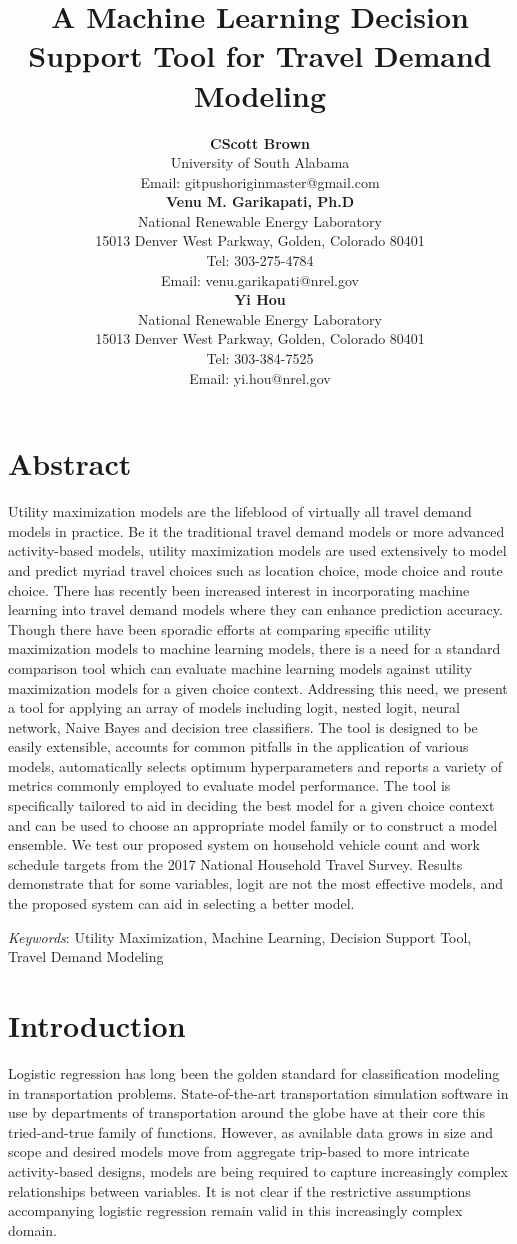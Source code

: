 \documentclass[numbered]{trbunofficial}
\title{A Machine Learning Decision Support Tool for Travel Demand Modeling}
\author{%
  \textbf{CScott Brown}\\
University of South Alabama\\
Email: gitpushoriginmaster@gmail.com\\
  \hfill\break%
  \textbf{Venu M. Garikapati, Ph.D}\\
National Renewable Energy Laboratory\\
15013 Denver West Parkway, Golden, Colorado 80401\\
Tel: 303-275-4784\\
Email: venu.garikapati@nrel.gov\\
  \hfill\break%
  \textbf{Yi Hou}\\
National Renewable Energy Laboratory\\
15013 Denver West Parkway, Golden, Colorado 80401\\
Tel: 303-384-7525\\
Email: yi.hou@nrel.gov \\
}
\begin{document}
\maketitle



\section{Abstract}
Utility maximization models are the lifeblood of virtually all travel demand models in practice. 
 Be it the traditional travel demand models or more advanced activity-based models, utility maximization models are used extensively to model and predict myriad travel choices such as location choice, mode choice and route choice. 
 There has recently been increased interest in incorporating machine learning into travel demand models where they can enhance prediction accuracy. 
 Though there have been sporadic efforts at comparing specific utility maximization models to machine learning models, there is a need for a standard comparison tool which can evaluate machine learning models against utility maximization models for a given choice context. 
 Addressing this need, we present a tool for applying an array of models including logit, nested logit, neural network, Naive Bayes and decision tree classifiers. 
 The tool is designed to be easily extensible, accounts for common pitfalls in the application of various models, automatically selects optimum hyperparameters and reports a variety of metrics commonly employed to evaluate model performance. 
 The tool is specifically tailored to aid in deciding the best model for a given choice context and can be used to choose an appropriate model family or to construct a model ensemble. 
 We test our proposed system on household vehicle count and work schedule targets from the 2017 National Household Travel Survey. 
 Results demonstrate that for some variables, logit are not the most effective models, and the proposed system can aid in selecting a better model.

\hfill\break%
\noindent\textit{Keywords}: Utility Maximization, Machine Learning, Decision Support Tool, Travel Demand Modeling
\newpage

\section{Introduction}\label{section:introduction}
Logistic regression has long been the golden standard for classification modeling in transportation problems.
 State-of-the-art transportation simulation software  in use by departments of transportation around the globe have at their core this tried-and-true family of functions.
 However, as available data grows in size and scope and desired models move from aggregate trip-based to more intricate activity-based designs, models are being required to capture increasingly complex relationships between variables.
 It is not clear if the restrictive assumptions accompanying logistic regression remain valid in this increasingly complex domain.
 
\end{document}

